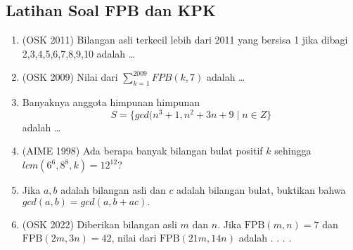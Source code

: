 \subsection{Latihan Soal FPB dan KPK}
\begin{enumerate}
    \item (OSK 2011) Bilangan asli terkecil lebih dari 2011 yang bersisa 1 jika dibagi 2,3,4,5,6,7,8,9,10 adalah \dots
    
    \item (OSK 2009) Nilai dari $\sum_{k=1}^{2009} FPB(k,7)$ adalah \dots
    
    \item Banyaknya anggota himpunan himpunan 
    $$S = \{gcd(n^3+1,n^2+3n+9 \mid n \in Z\}$$
    adalah \dots
    
    \item (AIME 1998) Ada berapa banyak bilangan bulat positif $k$ sehingga $lcm(6^6,8^8,k)=12^{12}$?
    
    \item Jika $a,b$ adalah bilangan asli dan $c$ adalah bilangan bulat, buktikan bahwa $gcd(a,b)=gcd(a,b+ac).$

    \item (OSK 2022) Diberikan bilangan asli $m$ dan $n$. Jika $\text{FPB}(m, n) = 7$ dan $\text{FPB}(2m, 3n) = 42$, nilai dari $\text{FPB}(21m, 14n)$ adalah . . . .
\end{enumerate}